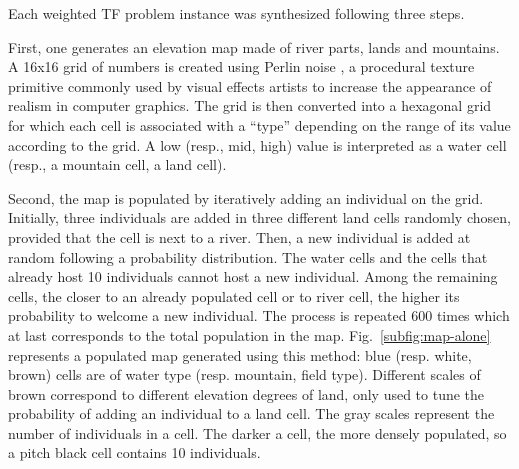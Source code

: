 \documentclass[conference]{IEEEtran}
\theoremstyle{definition}
\begin{document}
Each weighted TF problem instance was synthesized following three steps.

First, one generates an elevation map made of river parts, lands and mountains. 
A 16x16 grid of numbers is created using
Perlin noise \cite{perlin}, a procedural texture primitive commonly used by visual 
effects artists to increase the appearance of realism in
computer graphics. The grid is then converted into a hexagonal grid for which each cell is associated with
a ``type'' depending on the range of its value according to the grid.
A low (resp., mid, high) value is interpreted as a water cell (resp., a mountain cell, a land cell).

Second, the map is populated by iteratively adding an individual on the grid. 
Initially, three individuals are added in three different land cells randomly chosen,
provided that the cell is next to a river. Then, a new individual is added at 
random following a probability distribution.
The water cells and the cells that already host 10 individuals cannot host a new individual.
Among the remaining cells, the closer to an already populated cell or to river cell, 
the higher its probability to welcome a new individual.
The process is repeated 600 times which at last corresponds to the total 
population in the map. Fig.~\ref{subfig:map-alone} represents a populated map generated using 
this method: blue (resp. white, brown) cells are of water type (resp. mountain, field type). Different scales
of brown correspond to different elevation degrees of land, only 
used to tune the probability of adding an individual to a land cell.
The gray scales represent the number of individuals in a cell. 
The darker a cell, the more densely populated, so a pitch black cell contains 10 individuals.
\end{document}
